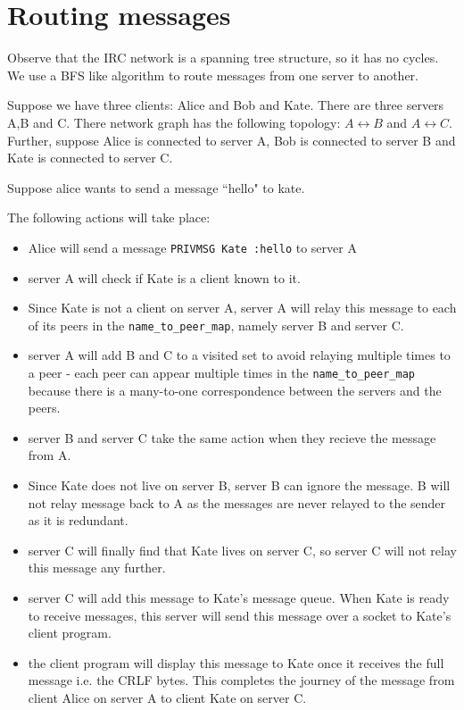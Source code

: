 \documentclass[letterpaper,twocolumn,10pt]{article}
\begin{document}
\section{Routing messages}

Observe that the IRC network is a spanning tree structure, so it has no cycles.
We use a BFS like algorithm to route messages from one server to another.

Suppose we have three clients: Alice and Bob and Kate. There are three servers
A,B and C. There network graph has the following topology: $A \leftrightarrow B$ and $A
	\leftrightarrow C$. Further, suppose Alice is connected to server A, Bob is connected to server B and Kate is
connected to server C.

Suppose alice wants to send a message ``hello" to kate.

The following actions will take place:

\begin{itemize}

	\item Alice will send a message \verb|PRIVMSG Kate :hello| to server A
	\item server A
	      will check if Kate is a client known to it.
	\item Since Kate is not a client on server
	      A, server A will relay this message to each of its peers in the
	      \verb|name_to_peer_map|, namely server B and server C.
	\item server A will add B
	      and C to a visited set to avoid relaying multiple times to a peer -
	      each peer can appear multiple times in the \verb|name_to_peer_map| because
	      there is a many-to-one correspondence between the servers and the peers.
	\item server B and server C take the same action when they recieve the message from A.
	\item Since Kate does not live on server B, server B
	      can ignore the message. B will not relay message back to A as
	      the messages are never relayed to the sender as it is redundant.
	\item server C will finally find that Kate lives on server C, so server C
	      will not relay this message any further.
	\item server C will add this message to Kate's message queue. When Kate is
	      ready to receive messages,
	      this server will send this message over a socket to Kate's client
	      program.
	\item the client program will display this message to Kate once it receives the
	      full message i.e. the CRLF bytes. This completes the journey of the message from client Alice
	      on server A to client Kate on server C.

\end{itemize}
\end{document}

